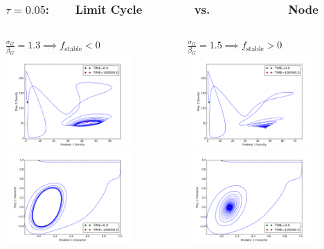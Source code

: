 \documentclass[10pt]{beamer}
\begin{document}
\begin{frame}
	\frametitle{{\small$\tau = 0.05$:}\ \ \ \ Limit Cycle\ \ \ \ \ \ \ \ vs.\ \ \ \ \ \ \ \ \ \ \ \ Node}
	\begin{columns}[t]
		\begin{column}{.5\textwidth}
			\centering
			$\frac{\sigma_G}{\beta_G} = 1.3 \implies f_{\text{stable}} < 0$\\
			\vspace{-1pt}
			\includegraphics[width=5cm,height=3.55cm]{figures/1x1/variable_growth/contour_plots/density_phase_plane_limit_cycle.png}\\
			\includegraphics[width=5cm,height=3.55cm]{figures/1x1/variable_growth/contour_plots/trait_phase_plane_limit_cycle.png}
		\end{column}
		\hspace{-30pt}
		\vrule{}
		\begin{column}{.5\textwidth}
			\centering
			$\frac{\sigma_G}{\beta_G} = 1.5 \implies f_{\text{stable}} > 0$\\
			\vspace{-1pt}
			\includegraphics[width=5cm,height=3.55cm]{figures/1x1/variable_growth/contour_plots/density_phase_plane_node.png}\\
			\includegraphics[width=5cm,height=3.55cm]{figures/1x1/variable_growth/contour_plots/trait_phase_plane_node.png}
		\end{column}
	\end{columns}
\end{frame}
\end{document}
